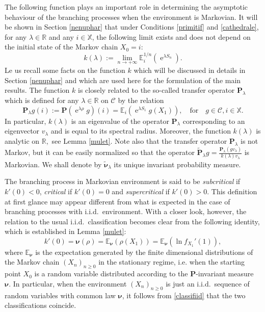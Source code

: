 \documentclass[12pt]{amsart}
\theoremstyle{definition}
\numberwithin{equation}{section}
\def\bb#1{\mathbb{#1}}
\def\bs#1{\boldsymbol{#1}}
\def\bf#1{\mathbf{#1}}
\def\scr#1{\mathscr{#1}}
\def\tbf#1{\tilde{\mathbf{#1}}}
\def\tbs#1{\tilde{\boldsymbol{#1}}}
\def\geq{\geqslant}
\renewcommand\ll{\lambda}
\DeclareMathOperator{\e}{e}
\begin{document}
The following function plays an important role in determining the 
asymptotic behaviour of the branching processes when the environment is Markovian.  
It will be shown in Section \ref{nenuphar} that under Conditions \ref{primitif} and \ref{cathedrale}, for any $\ll \in \bb R$ and any $i \in \bb X$, the following limit exists and does not depend on the initial state of the Markov chain $X_0=i$:
\[
k(\ll) := \lim_{n\to +\infty} \bb E_i^{1/n} \left( \e^{\ll S_n} \right).
\]
Le us recall some facts on the function $k$ which will be discussed in details in Section \ref{nenuphar} 
and which are used here for the formulation of the main results. 
The function $k$ is closely related to the so-called transfer operator $\bf P_{\ll}$ which is defined for any $\ll \in \bb R$ on $\scr C$ by the relation
\begin{equation}
	\label{transfoper}
	\bf P_{\ll}g(i) := \bf P\left( \e^{\ll \rho} g \right)(i) = \bb E_i \left( \e^{\ll S_1} g(X_1) \right), 
	\quad \mbox{for}\quad g \in \scr C, i \in \bb X.
\end{equation}
In particular, $k(\ll)$ is an eigenvalue 
of the operator $\mathbf P_{\ll}$ corresponding to an eigenvector $v_{\ll}$ 
and is equal to its spectral radius.   
Moreover, the function $k(\ll)$ is analytic on $\mathbb R,$ see Lemma \ref{mulet}. Note also that the transfer operator $\mathbf P_{\ll}$ is not Markov, but it can be easily normalized so that 
the operator $\tbf P_{\ll}g = \frac{\bf P_{\ll}(gv_{\ll})}{k(\ll)v_{\ll}}$ is Markovian. We shall denote by $\tbs \nu_{\ll}$ its 
unique invariant probability measure. 

The branching process in Markovian environment is said to be \textit{subcritical} if $k'(0)<0$, \textit{critical} if $k'(0)=0$ and \textit{supercritical} if $k'(0)>0$.
This definition at first glance may appear different from what is expected 
 in the case of branching processes with i.i.d.\ environment.
With a closer look, however, the relation to the usual i.i.d.\ classification
becomes clear from the following identity, which is established in Lemma \ref{mulet}: 
\begin{equation}
\label{classifiid}
k'(0) = \bs \nu(\rho) = \bb E_{\bs \nu} \left( \rho(X_1) \right) = \bb E_{\bs \nu} \left(  \ln f_{X_1}'(1) \right),
\end{equation}
where $\mathbb E_{\bs \nu} $ is the expectation generated by the finite dimensional distributions 
of the Markov chain $\left( X_n \right)_{n\geq 0}$ in the stationary regime, 
i.e. when the starting point $X_0$ is a random variable  
distributed according to the $\bf P$-invariant measure $\bs \nu.$
In particular, when the environment $\left( X_n \right)_{n\geq 0}$ 
is just an i.i.d.\ sequence of random variables with common law $\bs \nu$, it follows from \eqref{classifiid} that the two classifications coincide.
 
\end{document}
